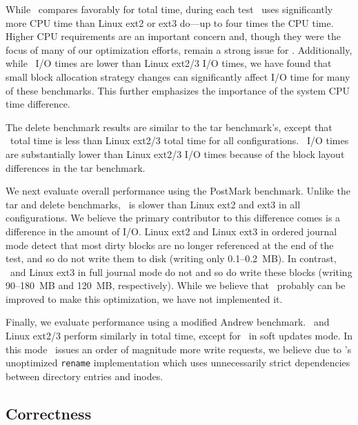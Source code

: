 While \Kudos\ compares favorably for total time, during each test
\Kudos\ uses significantly more CPU time than Linux ext2 or ext3
do---up to four times the CPU time.
%
Higher CPU requirements are an important concern and, though they were
the focus of many of our optimization efforts, remain a strong issue
for \Kudos.
%
Additionally, while \Kudos\ I/O times are lower than Linux ext2/3 I/O
times, we have found that small block allocation strategy changes can
significantly affect I/O time for many of these benchmarks. This further
emphasizes the importance of the system CPU time difference.


The delete benchmark results are similar to the tar benchmark's,
except that \Kudos\ total time is less than Linux ext2/3 total time
for all configurations. \Kudos\ I/O times are substantially lower
than Linux ext2/3 I/O times because of the block layout differences in
the tar benchmark.

We next evaluate overall performance using the PostMark benchmark.
Unlike the tar and delete benchmarks, \Kudos\ is slower than Linux
ext2 and ext3 in all configurations.
%
We believe the primary contributor to this difference comes is a
difference in the amount of I/O. Linux ext2 and Linux ext3 in ordered
journal mode detect that most dirty blocks are no longer referenced at
the end of the test, and so do not write them to disk (writing only
0.1--0.2~MB). In contrast, \Kudos\ and Linux ext3 in full journal mode
do not and so do write these blocks (writing 90--180~MB and 120~MB,
respectively).
%
While we believe that \Kudos\ probably can be improved to make this
optimization, we have not implemented it.
%

Finally, we evaluate performance using a modified Andrew benchmark.
\Kudos\ and Linux ext2/3 perform similarly in total time,
%
except for \Kudos\ in soft updates mode. In this mode \Kudos\ issues
an order of magnitude more write requests, we believe due to \Kudos's
unoptimized \texttt{rename} implementation which uses unnecessarily
strict dependencies between directory entries and inodes.

\subsection {Correctness}
\label{sec:eval:correctness}

